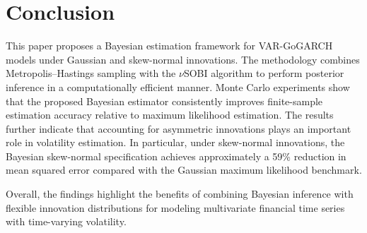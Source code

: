\documentclass[twoside]{article}
\begin{document}
\section*{Conclusion}

This paper proposes a Bayesian estimation framework for VAR-GoGARCH models under Gaussian and skew-normal innovations. The methodology combines Metropolis--Hastings sampling with the $\nu$SOBI algorithm to perform posterior inference in a computationally efficient manner.
Monte Carlo experiments show that the proposed Bayesian estimator consistently improves finite-sample estimation accuracy relative to maximum likelihood estimation. The results further indicate that accounting for asymmetric innovations plays an important role in volatility estimation. In particular, under skew-normal innovations, the Bayesian skew-normal specification achieves approximately a 59\% reduction in mean squared error compared with the Gaussian maximum likelihood benchmark.

Overall, the findings highlight the benefits of combining Bayesian inference with flexible innovation distributions for modeling multivariate financial time series with time-varying volatility.
\end{document}
